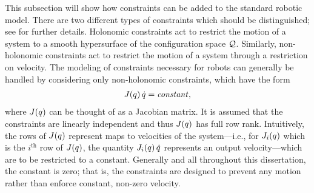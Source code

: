 This subsection will show how constraints can be added to the standard robotic
model.
%
There are two different types of constraints which should be distinguished; see
\cite[Ch. 6]{Murray1994} for further details.
%
Holonomic constraints act to restrict the motion of a system to a smooth
hypersurface of the configuration space $\mathcal{Q}$.
%
Similarly, non-holonomic constraints act to restrict the motion of a system
through a restriction on velocity.
%
The modeling of constraints necessary for robots can generally be handled by
considering only non-holonomic constraints, which have the form
\begin{align}
  \label{eq:holocon}
  J(q) \, \dot{q} = \mathit{constant},
\end{align}
where $J(q)$ can be thought of as a Jacobian matrix.
%
It is assumed that the constraints are linearly independent and thus $J(q)$
has full row rank.
%
Intuitively, the rows of $J(q)$ represent maps to velocities of the
system---i.e., for $J_{i}(q)$ which is the $i^{\mathrm{th}}$ row of
$J(q)$, the quantity $J_{i}(q) \, \dot{q}$ represents an output
velocity---which are to be restricted to a constant.
%
Generally and all throughout this dissertation, the constant is zero; that is,
the constraints are designed to prevent any motion rather than enforce constant,
non-zero velocity.

